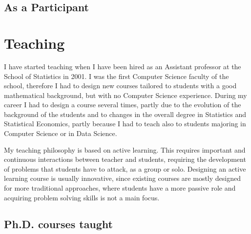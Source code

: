 \documentclass[11pt,a4paper,roman]{moderncv}
\begin{document}
\subsection{As a Participant}





\section{Teaching}

I have started teaching when I have been hired as an Assistant professor at
the School of Statistics in 2001.
I was the first Computer Science faculty of the school, therefore I had to
design new courses tailored to students with a good mathematical background,
but with no Computer Science experience.
During my career I had to design a course several times, partly due to the
evolution of the background of the students and to changes in the overall
degree in Statistics and Statistical Economics, partly because I had to teach
also to students majoring in Computer Science or in Data Science.

My teaching philosophy is based on active learning. This requires important
and continuous interactions between teacher and students, requiring the
development of problems that students have to attack, as a group or solo.
Designing an active learning course is usually innovative, since existing
courses are mostly designed for more traditional approaches, where students
have a more passive role and acquiring problem solving skills is not a main focus.

\subsection{Ph.D. courses taught}


\end{document}
